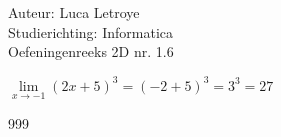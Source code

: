 \documentclass[a4paper]{article}
\begin{document}
  
\noindent \large Auteur: Luca Letroye \\
\noindent \large Studierichting: Informatica\\
\noindent \large Oefeningenreeks 2D nr. 1.6\\

\medskip

\normalsize

$\lim\limits_{x\rightarrow -1}(2x+5)^3 = (-2 + 5)^3 = 3^3 = 27 $




\begin{thebibliography}{999}
\end{thebibliography}
\end{document}
